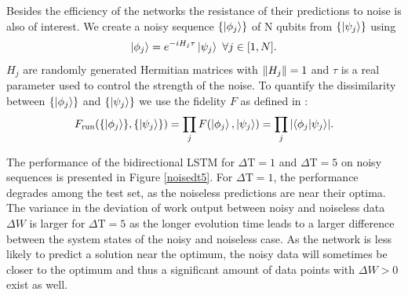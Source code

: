 Besides the efficiency of the networks the resistance of their predictions to noise is also of interest.
We create a noisy sequence $\{\ket{\phi_j}\}$ of N qubits from $\{\ket{\psi_j}\}$ using
\begin{align*}
	\ket{\phi_j} = e^{-i H_j \tau} \ket{\psi_j} \ \forall j \in [1, N].
\end{align*}
$H_j$ are randomly generated Hermitian matrices with $\norm{H_j} = 1$ and $\tau$ is a real parameter used to control the strength of the noise.
To quantify the dissimilarity between $\{\ket{\phi_j}\}$ and $\{\ket{\psi_j}\}$ we use the fidelity $F$ as defined in \cite{10.5555/1972505}:
\begin{align*}
	F_{\text{run}}(\{\ket{\phi_j}\}, \{\ket{\psi_j}\}) = \prod_j F(\ket{\phi_j}, \ket{\psi_j}) = \prod_j \abs{\bra{\phi_j}\ket{\psi_j}}.
\end{align*}

The performance of the bidirectional LSTM for $\Delta \mathrm{T} = 1$ and $\Delta \mathrm{T} = 5$ on noisy sequences is presented in Figure \ref{noisedt5}.
For $\Delta \mathrm{T} = 1$, the performance degrades among the test set, as the noiseless predictions are near their optima.
The variance in the deviation of work output between noisy and noiseless data $\Delta W$ is larger for $\Delta \mathrm{T} = 5$ as the longer evolution time leads to a larger difference between the system states of the noisy and noiseless case.
As the network is less likely to predict a solution near the optimum, the noisy data will sometimes be closer to the optimum and thus a significant amount of data points with $\Delta W > 0$ exist as well.

